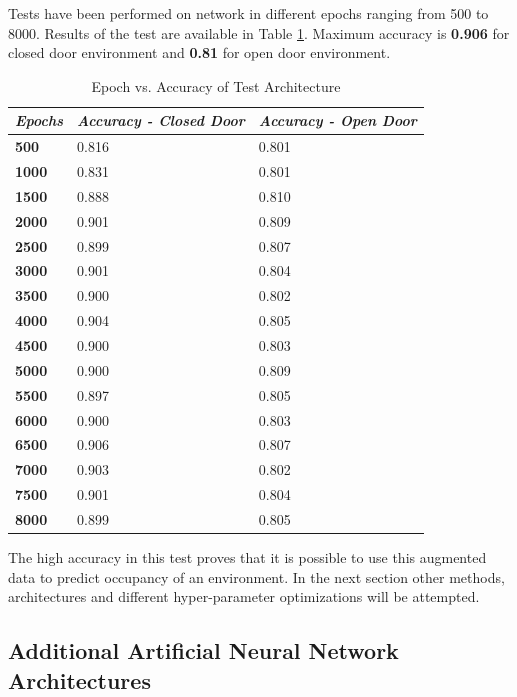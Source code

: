 \documentclass[conference]{IEEEtran}
\begin{document}
Tests have been performed on network in different epochs ranging from 500 to 8000. Results of the test are available in Table \ref{tbl-closed-door}. Maximum accuracy is \textbf{0.906} for closed door environment and \textbf{0.81} for open door environment.

\begin{table}[ht]
	\centering
	\caption{Epoch vs. Accuracy of Test Architecture}
	\label{tbl-closed-door}
	\begin{tabular}{|l|l|l|}
		\hline
		\textit{Epochs} & \textit{Accuracy - Closed Door} & \textit{Accuracy - Open Door} \\ \hline
		\textbf{500} & 0.816 & 0.801 \\ \hline
		\textbf{1000} & 0.831 & 0.801 \\ \hline
		\textbf{1500} & 0.888 & \cellcolor{green!25}0.810 \\ \hline
		\textbf{2000} & 0.901 & 0.809 \\ \hline
		\textbf{2500} & 0.899 & 0.807 \\ \hline
		\textbf{3000} & 0.901 & 0.804 \\ \hline
		\textbf{3500} & 0.900 & 0.802 \\ \hline
		\textbf{4000} & 0.904 & 0.805 \\ \hline
		\textbf{4500} & 0.900 & 0.803 \\ \hline
		\textbf{5000} & 0.900 & 0.809 \\ \hline
		\textbf{5500} & 0.897 & 0.805 \\ \hline
		\textbf{6000} & 0.900 & 0.803 \\ \hline 
		\textbf{6500} & \cellcolor{green!25}0.906 & 0.807 \\ \hline
		\textbf{7000} & 0.903 & 0.802 \\ \hline 
		\textbf{7500} & 0.901 & 0.804 \\ \hline
		\textbf{8000} & 0.899 & 0.805 \\ \hline
	\end{tabular}
\end{table}

The high accuracy in this test proves that it is possible to use this augmented data to predict occupancy of an environment. In the next section other methods, architectures and different hyper-parameter optimizations will be attempted.


\subsection{Additional Artificial Neural Network Architectures}
\end{document}
